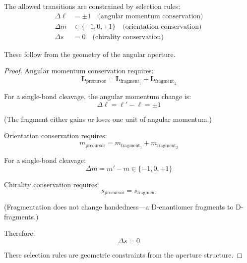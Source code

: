 \begin{corollary}
\label{cor:selection_rules}
The allowed transitions are constrained by selection rules:
\begin{align}
\Delta\ell &= \pm 1 \quad \text{(angular momentum conservation)} \\
\Delta m &\in \{-1, 0, +1\} \quad \text{(orientation conservation)} \\
\Delta s &= 0 \quad \text{(chirality conservation)}
\end{align}

These follow from the geometry of the angular aperture.
\end{corollary}

\begin{proof}
Angular momentum conservation requires:
\begin{equation}
\mathbf{L}_{\text{precursor}} = \mathbf{L}_{\text{fragment}_1} + \mathbf{L}_{\text{fragment}_2}
\end{equation}

For a single-bond cleavage, the angular momentum change is:
\begin{equation}
\Delta\ell = \ell' - \ell = \pm 1
\end{equation}

(The fragment either gains or loses one unit of angular momentum.)

Orientation conservation requires:
\begin{equation}
m_{\text{precursor}} = m_{\text{fragment}_1} + m_{\text{fragment}_2}
\end{equation}

For a single-bond cleavage:
\begin{equation}
\Delta m = m' - m \in \{-1, 0, +1\}
\end{equation}

Chirality conservation requires:
\begin{equation}
s_{\text{precursor}} = s_{\text{fragment}}
\end{equation}

(Fragmentation does not change handedness—a D-enantiomer fragments to D-fragments.)

Therefore:
\begin{equation}
\Delta s = 0
\end{equation}

These selection rules are geometric constraints from the aperture structure.
\end{proof}

